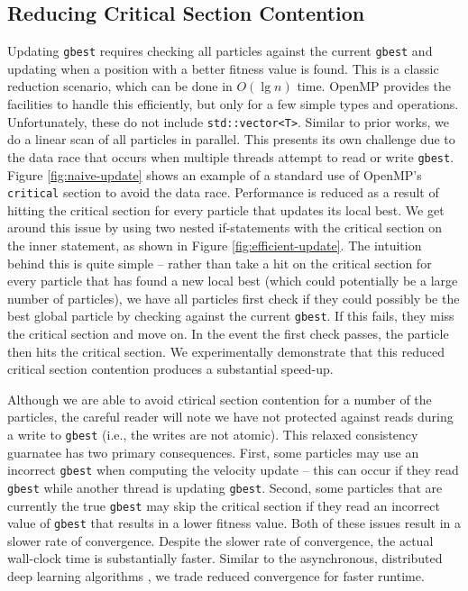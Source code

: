\subsection{Reducing Critical Section Contention}
Updating \texttt{gbest}
requires checking all particles against the current \texttt{gbest} and updating
when a position with a better fitness value is found. This is a classic
reduction scenario, which can be done in $O(\lg n)$ time. OpenMP provides the
facilities to handle this efficiently, but only for a few simple types and
operations. Unfortunately, these do not include \texttt{std::vector<T>}. Similar to
prior works, we do a linear scan of all particles in parallel. This presents its
own challenge due to the data race that occurs when multiple threads attempt to
read or write \texttt{gbest}. Figure \ref{fig:naive-update} shows an example of a
standard use of OpenMP's \texttt{critical} section to avoid the data race.
Performance is reduced as a result of hitting the critical section for every
particle that updates its local best. We get around this issue by using two nested if-statements
with the critical section on the inner statement, as shown in Figure
\ref{fig:efficient-update}. The intuition behind this is quite simple -- rather
than take a hit on the critical section for every particle that has found a new
local best (which could potentially be a large number of particles), we
have all particles first check if they could possibly be the best global
particle by checking against the current \texttt{gbest}. If this fails, they
miss the critical section and move on. In the event the first check passes, the
particle then hits the critical section. We experimentally demonstrate that this
reduced critical section contention produces a substantial speed-up.

Although we are able to avoid ctirical section contention for a number of the
particles, the careful reader will note we have not protected against reads
during a write to \texttt{gbest} (i.e., the writes are not atomic).
This relaxed consistency guarnatee has two primary
consequences. First, some particles may use an incorrect \texttt{gbest} when
computing the velocity update -- this can occur if they read \texttt{gbest}
while another thread is updating \texttt{gbest}. Second, some particles that are
currently the true \texttt{gbest} may skip the critical section if they read an
incorrect value of \texttt{gbest} that results in a lower fitness value. Both of
these issues result in a slower rate of convergence. Despite the slower rate of convergence,
the actual wall-clock time is substantially faster. Similar to the asynchronous,
distributed deep learning algorithms \cite{adam, downpour}, we trade reduced convergence for
faster runtime.


